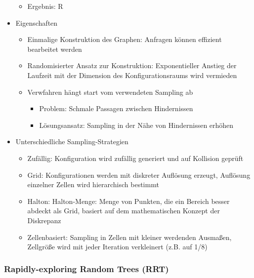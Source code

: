 \documentclass[paper=a4, fontsize=11pt]{scrartcl} %
\numberwithin{equation}{section} %
\numberwithin{figure}{section} %
\numberwithin{table}{section} %
\begin{document}
\begin{itemize}
\begin{itemize}
\begin{itemize}
\begin{itemize}
\end{itemize}
\end{itemize}
\item Ergebnis: R
\end{itemize}
\item Eigenschaften
\begin{itemize}
\item Einmalige Konstruktion des Graphen: Anfragen können effizient bearbeitet werden
\item Randomisierter Ansatz zur Konstruktion: Exponentieller Anstieg der Laufzeit mit der Dimension des Konfigurationsraums wird vermieden
\item Verwfahren hängt start vom verwendeten Sampling ab
\begin{itemize}
\item Problem: Schmale Passagen zwischen Hindernissen
\item Lösungsansatz: Sampling in der Nähe von Hindernissen erhöhen
\end{itemize}
\end{itemize}
\item Unterschiedliche Sampling-Strategien
\begin{itemize}
\item Zufällig: Konfiguration wird zufällig generiert und auf Kollision geprüft
\item Grid: Konfigurationen werden mit diskreter Auflösung erzeugt, Auflösung einzelner Zellen wird hierarchisch bestimmt
\item Halton: Halton-Menge: Menge von Punkten, die ein Bereich besser abdeckt als Grid, basiert auf dem mathematischen Konzept der Diskrepanz
\item Zellenbasiert: Sampling in Zellen mit kleiner werdenden Ausmaßen, Zellgröße wird mit jeder Iteration verkleinert (z.B. auf 1/8)
\end{itemize}
\end{itemize}

\subsubsection{Rapidly-exploring Random Trees (RRT)}
\end{document}
